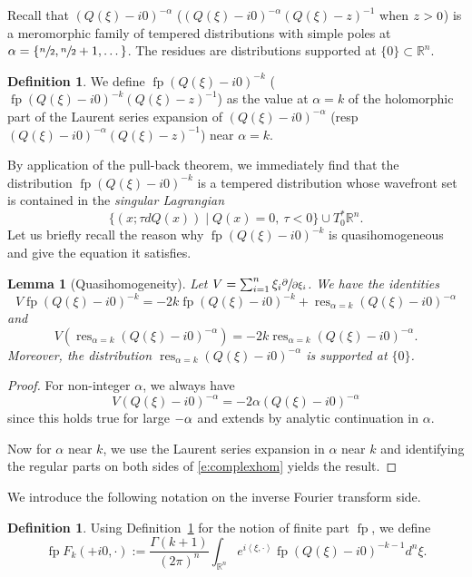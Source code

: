 \documentclass[10pt]{amsart}
\newtheorem{lemma}[theorem]{Lemma}
\theoremstyle{definition}
\newtheorem{definition}[theorem]{Definition}
\let\cv\alpha
\let\st\mid
\let\Feuler V
\let\Im\relax
\let\Re\relax
\DeclareMathOperator{\Im}{Im}
\DeclareMathOperator{\Re}{Re}
\DeclareMathOperator*{\pf}{fp}
\DeclareMathOperator*{\res}{res}
\begin{document}
Recall that {$(Q(\xi)-i0)^{-\cv}$} (\resp $ (Q(\xi)-i0)^{-\cv} (Q(\xi)-z)^{-1} $ when $\Im z>0$) is a meromorphic family of tempered distributions with simple poles at \hbox{$\cv=\{\sfrac{n}{2},\sfrac{n}{2}+1,\dots \}$}. The residues are distributions supported at $\{0\}\subset \mathbb{R}^n$.

\begin{definition}\label{d:finitepart}
We define $\pf(Q(\xi)-i0)^{-k}$ {(\resp $ \pf (Q(\xi)-i0)^{-k} (Q(\xi)-z)^{-1} $)} as the value at $\cv=k$ of the holomorphic part of the Laurent series expansion of
$(Q(\xi)-i0)^{-\cv}$ (resp $ (Q(\xi)-i0)^{-\cv} (Q(\xi)-z)^{-1} $) near $\cv=k$.
\end{definition}

By application of the pull-back theorem, we immediately find that
the distribution $\pf (Q(\xi)-i0)^{-k}$ is a tempered distribution
whose wavefront set is contained in the
\emph{singular Lagrangian}
\[
\{(x;\tau dQ(x)) \st Q(x)=0, \ \tau < 0 \}\cup T^*_0\mathbb{R}^n.
\]
Let us briefly recall the reason why
$\pf(Q(\xi)-i0)^{-k}$ is quasihomogeneous and
give the equation it satisfies.
\begin{lemma}[Quasihomogeneity]
Let $\Feuler=\sum_{i=1}^n\xi_i\sfrac{\partial}{\partial \xi_i}$. We have the identities
\[
{\Feuler} \pf(Q(\xi)-i0)^{-k}=-2k\pf(Q(\xi)-i0)^{-k}+\res_{\cv=k}(Q(\xi)-i0)^{-\cv}
\]
and
\[
{\Feuler}(\res_{\cv=k}(Q(\xi)-i0)^{-\cv})=-2k\res_{\cv=k}(Q(\xi)-i0)^{-\cv}.
\]
Moreover, the distribution $\res_{\cv=k}(Q(\xi)-i0)^{-\cv}$ is supported at $\{0\}$.
\end{lemma}

\begin{proof}
For non-integer $\cv$, we always have
\begin{equation}\label{e:complexhom}
{\Feuler}(Q(\xi)-i0)^{-\cv}=-2\cv (Q(\xi)-i0)^{-\cv}
\end{equation}
since this holds true for large $-\Re\cv$ and
extends by analytic continuation in $\cv$.

Now for $\cv$ near $k$, we use the Laurent series expansion in $\cv$ near $k$ and identifying the regular parts on both sides of \eqref{e:complexhom} yields the result.
\end{proof}

We introduce the following notation on the inverse Fourier transform side.

\begin{definition}
Using Definition~\ref{d:finitepart} for the notion of finite part $\pf$, we define
\[
\pf F_k(+i0,\cdot):= \frac{\Gamma(k+1)}{(2\pi)^n} \int_{\mathbb{R}^n} e^{i \left\langle \xi,\cdot \right\rangle} \pf(Q(\xi)-i0)^{-k-1} d^n\xi.
\]
\end{definition}
\end{document}
